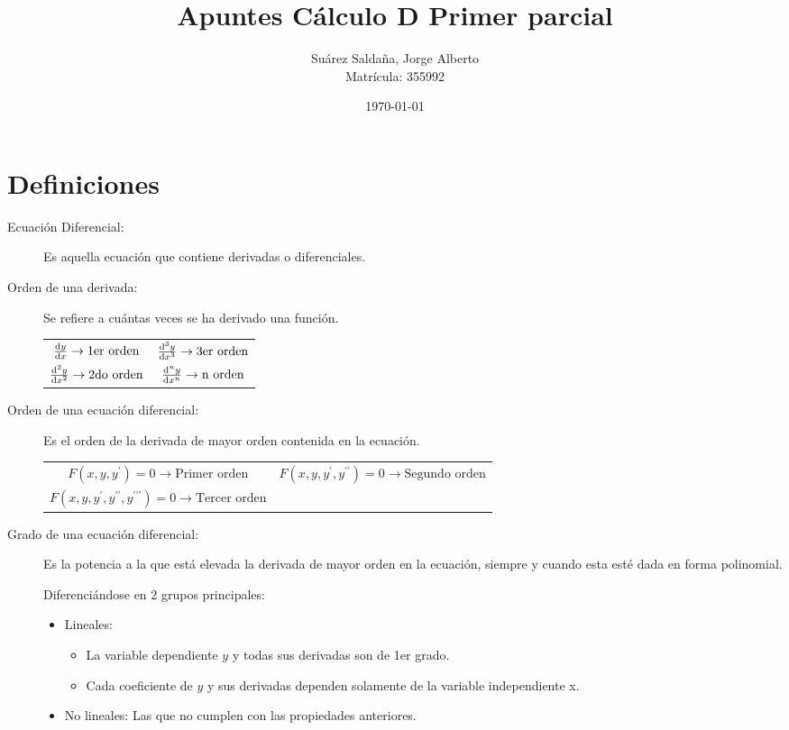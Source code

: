 \documentclass[12pt]{article} %
\title{Apuntes Cálculo D Primer parcial}
\author{Suárez Saldaña, Jorge Alberto \\ Matrícula: 355992}
\date{\today}
\begin{document}
\maketitle

\section{Definiciones}

\begin{description}
  \item[Ecuación Diferencial:] Es aquella ecuación que contiene derivadas o diferenciales.

  \item[Orden de una derivada:] Se refiere a cuántas veces se ha derivado una función.
    \begin{table}[H]
      \centering
    \begin{tabular}{cc}
      $\dv{y}{x} \rightarrow \text{1er orden}$ & $\dv[3]{y}{x} \rightarrow \text{3er orden}$ \\[0.5em]
      $\dv[2]{y}{x} \rightarrow \text{2do orden}$ & $\dv[n]{y}{x} \rightarrow \text{n orden}$
    \end{tabular}
  \end{table}

  \item[Orden de una ecuación diferencial:] Es el orden de la derivada de mayor orden contenida en la ecuación.
    \begin{table}[H]
      \centering
    \begin{tabular}{cc}
      $F(x,y,y^{\prime}) = 0 \rightarrow \text{Primer orden}$ & 
      $F(x,y,y^{\prime},y^{\prime \prime}) = 0 \rightarrow \text{Segundo orden}$ \\[0.5em]
      $F(x,y,y^{\prime},y^{\prime \prime},y^{\prime \prime \prime}) = 0 \rightarrow \text{Tercer orden}$
    \end{tabular}
  \end{table}

\item[Grado de una ecuación diferencial:] Es la potencia a la que está elevada la derivada de mayor orden en la ecuación, 
  siempre y cuando esta esté dada en forma polinomial.

  Diferenciándose en 2 grupos principales:
  \begin{itemize}
    \item Lineales: 
      \begin{itemize}
        \item La variable dependiente $y$ y todas sus derivadas son de 1er grado.
        \item Cada coeficiente de $y$ y sus derivadas dependen solamente de la variable independiente x.
      \end{itemize}
    \item No lineales: Las que no cumplen con las propiedades anteriores.
  \end{itemize}
\end{description}
\end{document}
